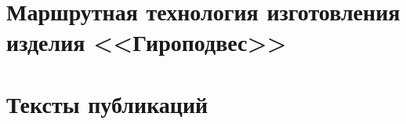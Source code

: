 \chapter{Маршрутная технология изготовления изделия <<Гироподвес>>}\label{app:A}

\clearpage



\chapter{Тексты публикаций}\label{app:B}

\clearpage












%
